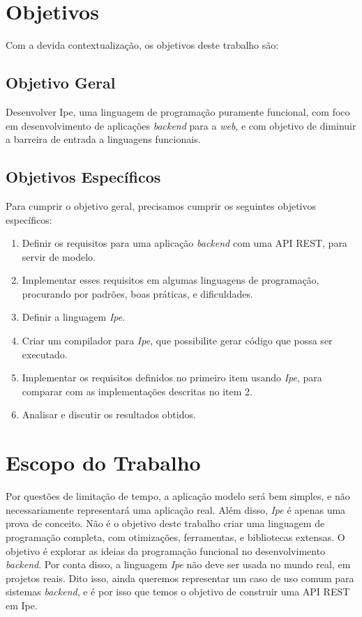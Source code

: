 \section{Objetivos}\label{sec:objectives}

Com a devida contextualização, os objetivos deste trabalho são:

\subsection{Objetivo Geral}

Desenvolver Ipe, uma linguagem de programação puramente funcional, com foco em desenvolvimento de
aplicações \textit{backend} para a \textit{web}, e com objetivo de diminuir a barreira de entrada a
linguagens funcionais.

\subsection{Objetivos Específicos}

Para cumprir o objetivo geral, precisamos cumprir os seguintes objetivos específicos:

\begin{enumerate}
      \item Definir os requisitos para uma aplicação \textit{backend} com uma API
            REST, para servir de modelo.
      \item Implementar esses requisitos em algumas linguagens de programação,
            procurando por padrões, boas práticas, e dificuldades.
      \item Definir a linguagem \textit{Ipe}.
      \item Criar um compilador para \textit{Ipe}, que possibilite gerar código
            que possa ser executado.
      \item Implementar os requisitos definidos no primeiro item usando \textit{Ipe},
            para comparar com as implementações descritas no item 2.
      \item Analisar e discutir os resultados obtidos.
\end{enumerate}


\section{Escopo do Trabalho}

Por questões de limitação de tempo, a aplicação modelo será bem simples, e não
necessariamente representará uma aplicação real. Além disso, \textit{Ipe} é apenas
uma prova de conceito. Não é o objetivo deste trabalho criar uma linguagem de
programação completa, com otimizações, ferramentas, e bibliotecas extensas. O
objetivo é explorar as ideias da programação funcional no desenvolvimento
\textit{backend}. Por conta disso, a linguagem \textit{Ipe} não deve ser usada
no mundo real, em projetos reais. Dito isso, ainda queremos representar um caso
de uso comum para sistemas \textit{backend}, e é por isso que temos o objetivo
de construir uma API REST em Ipe.

